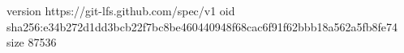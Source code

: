 version https://git-lfs.github.com/spec/v1
oid sha256:e34b272d1dd3bcb22f7bc8be460440948f68cac6f91f62bbb18a562a5fb8fe74
size 87536
